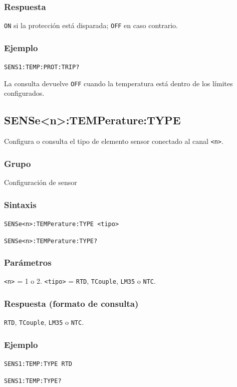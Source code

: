\subsubsection*{Respuesta}
\texttt{ON} si la protección está disparada; \texttt{OFF} en caso contrario.

\subsubsection*{Ejemplo}
\texttt{SENS1:TEMP:PROT:TRIP?}

La consulta devuelve \texttt{OFF} cuando la temperatura está dentro de los
límites configurados.

\subsection*{SENSe<n>:TEMPerature:TYPE}

Configura o consulta el tipo de elemento sensor conectado al canal
\texttt{<n>}.

\subsubsection*{Grupo}
Configuración de sensor

\subsubsection*{Sintaxis}
\texttt{SENSe<n>:TEMPerature:TYPE <tipo>}\par
\texttt{SENSe<n>:TEMPerature:TYPE?}

\subsubsection*{Parámetros}
\texttt{<n>} = 1 o 2. \texttt{<tipo>} = \texttt{RTD}, \texttt{TCouple},
\texttt{LM35} o \texttt{NTC}.

\subsubsection*{Respuesta (formato de consulta)}
\texttt{RTD}, \texttt{TCouple}, \texttt{LM35} o \texttt{NTC}.

\subsubsection*{Ejemplo}
\texttt{SENS1:TEMP:TYPE RTD}\par
\texttt{SENS1:TEMP:TYPE?}

